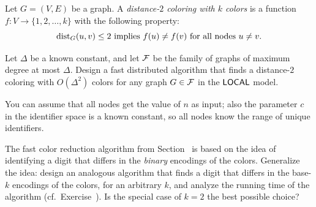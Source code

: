 \begin{ex}\label{ex:distance2col}
    Let $G = (V,E)$ be a graph. A \emph{distance-$2$ coloring with $k$ colors} is a function $f \colon V \to \{1,2,\dotsc,k\}$ with the following property:
    \[
        \operatorname{dist}_G(u,v) \le 2 \text{ implies } f(u) \ne f(v) \text{ for all nodes } u \ne v.
    \]

    Let $\Delta$ be a known constant, and let $\mathcal{F}$ be the family of graphs of maximum degree at most $\Delta$. Design a fast distributed algorithm that finds a distance-$2$ coloring with $O(\Delta^2)$ colors for any graph $G \in \mathcal{F}$ in the $\textup{\sffamily LOCAL}$ model.

    You can assume that all nodes get the value of $n$ as input; also the parameter $c$ in the identifier space is a known constant, so all nodes know the range of unique identifiers.

\end{ex}

\begin{exs}\label{ex:dpbit-base}
    The fast color reduction algorithm from Section~ is based on the idea of identifying a digit that differs in the \emph{binary} encodings of the colors. Generalize the idea: design an analogous algorithm that finds a digit that differs in the base-$k$ encodings of the colors, for an arbitrary $k$, and analyze the running time of the algorithm (cf.\ Exercise~). Is the special case of $k = 2$ the best possible choice?
\end{exs}

